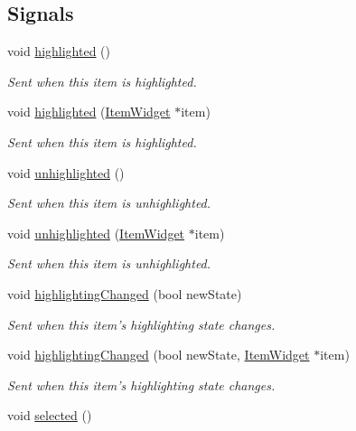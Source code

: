 \subsection*{Signals}
\begin{DoxyCompactItemize}
\item 
\hypertarget{class_u_i_1_1_item_widget_a7b1c639c5da593997ec2ae4c33fed9d3}{void \hyperlink{class_u_i_1_1_item_widget_a7b1c639c5da593997ec2ae4c33fed9d3}{highlighted} ()}\label{class_u_i_1_1_item_widget_a7b1c639c5da593997ec2ae4c33fed9d3}

\begin{DoxyCompactList}\small\item\em Sent when this item is highlighted. \end{DoxyCompactList}\item 
void \hyperlink{class_u_i_1_1_item_widget_a579005c3f124f5aa64676f282a3be5c1}{highlighted} (\hyperlink{class_u_i_1_1_item_widget}{Item\-Widget} $\ast$item)
\begin{DoxyCompactList}\small\item\em Sent when this item is highlighted. \end{DoxyCompactList}\item 
\hypertarget{class_u_i_1_1_item_widget_a95b8dc55a9ec97f1eb908f142e41d42b}{void \hyperlink{class_u_i_1_1_item_widget_a95b8dc55a9ec97f1eb908f142e41d42b}{unhighlighted} ()}\label{class_u_i_1_1_item_widget_a95b8dc55a9ec97f1eb908f142e41d42b}

\begin{DoxyCompactList}\small\item\em Sent when this item is unhighlighted. \end{DoxyCompactList}\item 
void \hyperlink{class_u_i_1_1_item_widget_a5c3566b2782896b87350db115ecf098b}{unhighlighted} (\hyperlink{class_u_i_1_1_item_widget}{Item\-Widget} $\ast$item)
\begin{DoxyCompactList}\small\item\em Sent when this item is unhighlighted. \end{DoxyCompactList}\item 
void \hyperlink{class_u_i_1_1_item_widget_ad4eeea089f607bb67171f1fb7ab89fa6}{highlighting\-Changed} (bool new\-State)
\begin{DoxyCompactList}\small\item\em Sent when this item's highlighting state changes. \end{DoxyCompactList}\item 
void \hyperlink{class_u_i_1_1_item_widget_a3c71baf568c4aa438005a8cedb43eb6a}{highlighting\-Changed} (bool new\-State, \hyperlink{class_u_i_1_1_item_widget}{Item\-Widget} $\ast$item)
\begin{DoxyCompactList}\small\item\em Sent when this item's highlighting state changes. \end{DoxyCompactList}\item 
\hypertarget{class_u_i_1_1_item_widget_a6657b3214eece5138c4f730466ed03f2}{void \hyperlink{class_u_i_1_1_item_widget_a6657b3214eece5138c4f730466ed03f2}{selected} ()}\label{class_u_i_1_1_item_widget_a6657b3214eece5138c4f730466ed03f2}


\end{DoxyCompactItemize}
